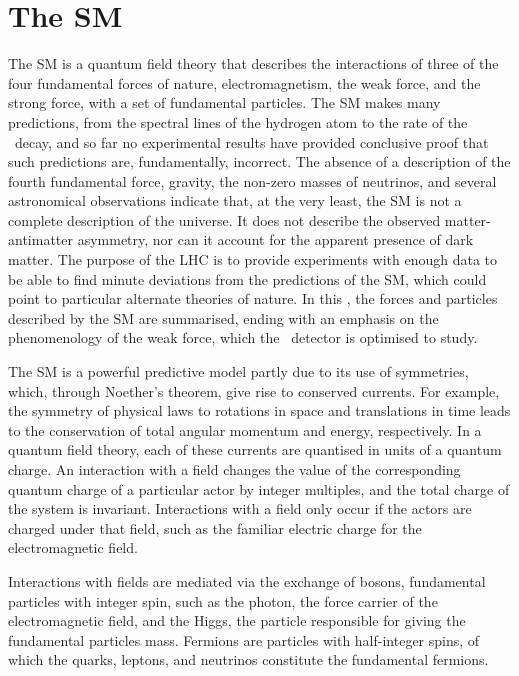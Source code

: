 \chapter{The \acl{SM}}
\label{chap:intro:sm}

The \acf{SM} is a quantum field theory that describes the interactions of three 
of the four fundamental forces of nature, electromagnetism, the weak force, and 
the strong force, with a set of fundamental particles.
The \ac{SM} makes many predictions, from the spectral lines of the hydrogen  
atom to the rate of the \BsTomumu\ decay, and so far no experimental results 
have provided conclusive proof that such predictions are, fundamentally, 
incorrect.
The absence of a description of the fourth fundamental force, gravity, the 
non-zero masses of neutrinos, and several astronomical observations indicate 
that, at the very least, the \ac{SM} is not a complete description of the 
universe.
It does not describe the observed matter-antimatter asymmetry, nor can it 
account for the apparent presence of dark matter.
The purpose of the \ac{LHC} is to provide experiments with enough data to be 
able to find minute deviations from the predictions of the \ac{SM}, which could point to particular alternate theories of nature.
In this , the forces and particles described by the 
\ac{SM} are summarised, ending with an emphasis on the phenomenology of the 
weak force, which the \lhcb\ detector is optimised to study.

The \ac{SM} is a powerful predictive model partly due to its use of symmetries, which, through Noether's theorem, give rise to conserved currents.
For example, the symmetry of physical laws to rotations in space and 
translations in time leads to the conservation of total angular momentum and energy, 
respectively.
In a quantum field theory, each of these currents are quantised in units of a 
quantum charge.
An interaction with a field changes the value of the corresponding quantum 
charge of a particular actor by integer multiples, and the total charge of the 
system is invariant.
Interactions with a field only occur if the actors are charged under that 
field, such as the familiar electric charge for the electromagnetic field.

Interactions with fields are mediated via the exchange of bosons, fundamental 
particles with integer spin, such as the photon, the force carrier of the 
electromagnetic field, and the Higgs, the particle responsible for giving the 
fundamental particles mass.
Fermions are particles with half-integer spins, of which the quarks, leptons, 
and neutrinos constitute the fundamental fermions.

